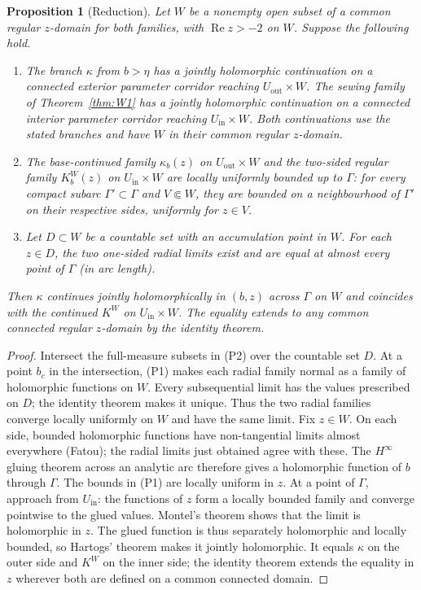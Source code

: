 \documentclass[11pt]{amsart}
\newtheorem{proposition}[theorem]{Proposition}
\theoremstyle{definition}
\newcommand{\Kk}{K}
\begin{document}
\begin{proposition}[Reduction]\label{prop:brjuno}
Let $W$ be a nonempty open subset of a common regular $z$-domain for both
families, with $\operatorname{Re}z>-2$ on $W$.  Suppose the following hold.
\begin{enumerate}
\item[(P0)] The branch $\kappa$ from $b>\eta$ has a jointly holomorphic
  continuation on a connected exterior parameter corridor reaching
  $U_{\mathrm{out}}\times W$.  The sewing family of
  Theorem~\ref{thm:W1} has a jointly holomorphic continuation on a
  connected interior parameter corridor reaching $U_{\mathrm{in}}\times W$.
  Both continuations use the stated branches and have $W$ in their common
  regular $z$-domain.
\item[(P1)] The base-continued family $\kappa_b(z)$ on
  $U_{\mathrm{out}}\times W$ and the two-sided regular family
  $\Kk^W_b(z)$ on $U_{\mathrm{in}}\times W$ are locally uniformly bounded
  up to $\Gamma$: for every compact subarc $\Gamma'\subset\Gamma$ and
  $V\Subset W$, they are bounded on a neighbourhood of $\Gamma'$ on their
  respective sides, uniformly for $z\in V$.
\item[(P2)] Let $D\subset W$ be a countable set with an accumulation point
  in $W$.  For each $z\in D$, the two one-sided radial limits exist and
  are equal at almost every point of $\Gamma$ (in arc length).
\end{enumerate}
Then $\kappa$ continues jointly holomorphically in $(b,z)$ across $\Gamma$
on $W$ and coincides with the continued $\Kk^W$ on
$U_{\mathrm{in}}\times W$.
The equality extends to any common connected regular $z$-domain by the
identity theorem.
\end{proposition}

\begin{proof}
Intersect the full-measure subsets in (P2) over the countable set $D$.
At a point $b_c$ in the intersection, (P1) makes each radial family normal
as a family of holomorphic functions on $W$.  Every subsequential limit
has the values prescribed on $D$; the identity theorem makes it unique.
Thus the two radial families converge locally uniformly on $W$ and have
the same limit.  Fix $z\in W$.  On each side, bounded holomorphic functions
have non-tangential limits almost everywhere (Fatou); the radial limits
just obtained agree with these.
The $H^\infty$ gluing theorem across an analytic arc therefore gives a
holomorphic function of $b$ through $\Gamma$.  The bounds in (P1) are locally
uniform in $z$.  At a point of $\Gamma$, approach from $U_{\mathrm{in}}$:
the functions of $z$ form a locally bounded family and converge pointwise to
the glued values.  Montel's theorem shows that the limit is holomorphic in
$z$.  The glued function is thus separately holomorphic and locally bounded,
so Hartogs' theorem makes it jointly holomorphic.  It equals $\kappa$ on the
outer side and $\Kk^W$ on the inner side; the identity theorem extends the
equality in $z$ wherever both are defined on a common connected domain.
\end{proof}
\end{document}
